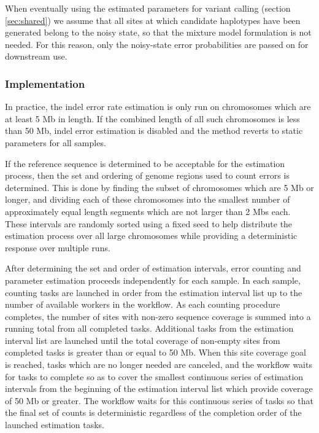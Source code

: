 \documentclass{article}
\begin{document}
When eventually using the estimated parameters for variant calling (section \ref{sec:shared}) we assume that all sites at which candidate haplotypes have been generated belong to the noisy state, so that the mixture model formulation is not needed. For this reason, only the noisy-state error probabilities are passed on for downstream use.

\subsubsection{Implementation}
\label{sec:error_estimation_implementation}

In practice, the indel error rate estimation is only run on chromosomes which are at least 5 Mb in length. If the combined length of all such chromosomes is less than 50 Mb, indel error estimation is disabled and the method reverts to static parameters for all samples.

If the reference sequence is determined to be acceptable for the estimation process, then the set and ordering of genome regions used to count errors is determined. This is done by finding the subset of chromosomes which are 5 Mb or longer, and dividing each of these chromosomes into the smallest number of approximately equal length segments which are not larger than 2 Mbs each. These intervals are randomly sorted using a fixed seed to help distribute the estimation process over all large chromosomes while providing a deterministic response over multiple runs.

After determining the set and order of estimation intervals, error counting and parameter estimation proceeds independently for each sample. In each sample, counting tasks are launched in order from the estimation interval list up to the number of available workers in the workflow. As each counting procedure completes, the number of sites with non-zero sequence coverage is summed into a running total from all completed tasks. Additional tasks from the estimation interval list are launched until the total coverage of non-empty sites from completed tasks is greater than or equal to 50 Mb. When this site coverage goal is reached, tasks which are no longer needed are canceled, and the workflow waits for tasks to complete so as to cover the smallest continuous series of estimation intervals from the beginning of the estimation interval list which provide coverage of 50 Mb or greater. The workflow waits for this continuous series of tasks so that the final set of counts is deterministic regardless of the completion order of the launched estimation tasks.
\end{document}

